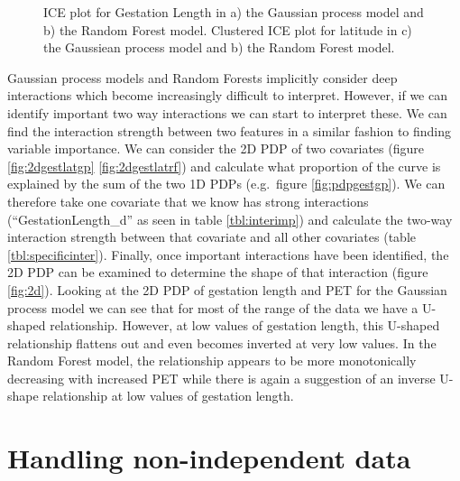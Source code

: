 \documentclass[10pt,]{article}
\begin{document}
\begin{figure}[t!]
  \centering


  \label{fig:ice}
  \caption{
    ICE plot for Gestation Length in a) the Gaussian process model and b) the Random Forest model.
    Clustered ICE plot for latitude in c) the Gaussiean process model and b) the Random Forest model.
  }
\end{figure}


Gaussian process models and Random Forests implicitly consider deep interactions which become increasingly difficult to interpret.
However, if we can identify important two way interactions we can start to interpret these.
We can find the interaction strength between two features in a similar fashion to finding variable importance.
We can consider the 2D PDP of two covariates (figure \ref{fig:2dgestlatgp} \ref{fig:2dgestlatrf}) and calculate what proportion of the curve is explained by the sum of the two 1D PDPs (e.g.~figure \ref{fig:pdpgestgp}).
We can therefore take one covariate that we know has strong interactions (``GestationLength\_d'' as seen in table \ref{tbl:interimp}) and calculate the two-way interaction strength between that covariate and all other covariates (table \ref{tbl:specificinter}).
Finally, once important interactions have been identified, the 2D PDP can be examined to determine the shape of that interaction (figure \ref{fig:2d}).
Looking at the 2D PDP of gestation length and PET for the Gaussian process model we can see that for most of the range of the data we have a U-shaped relationship.
However, at low values of gestation length, this U-shaped relationship flattens out and even becomes inverted at very low values.
In the Random Forest model, the relationship appears to be more monotonically decreasing with increased PET while there is again a suggestion of an inverse U-shape relationship at low values of gestation length.



\section{Handling non-independent data}\label{handling-non-independent-data}
\end{document}
